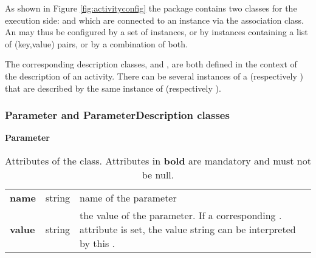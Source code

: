 As shown in Figure \ref{fig:activityconfig} the  package contains two classes for the execution side:  and  which are connected to an  instance via the  association class.
An  may thus be configured by a set of  instances, or by  instances containing a list of (key,value) pairs, or by a combination of both.

The corresponding description classes,  and , are both defined in the context of the description of an activity.
There can be several instances of a  (respectively ) that are described by the same instance of  (respectively ).


\subsubsection{Parameter and ParameterDescription classes}
\label{sec:parameterandD}

\begin{table}[ht]
\small
{}\textwidth
 \textbf{\normalsize Parameter}\vspace{0.25em}\\
 \begin{tabulary}{1.0\textwidth}{llL}
 \toprule
  &    & \\
 \midrule
\textbf{name}  & string & name of the parameter \\
\textbf{value} & string & the value of the parameter. If a corresponding . attribute is set, the value string can be interpreted by this . \\
\bottomrule
\end{tabulary}
\caption[Attributes of the  class]{Attributes of the  class. Attributes in \textbf{bold} are mandatory and must not be null.}
\label{tab:param}
\end{table}

